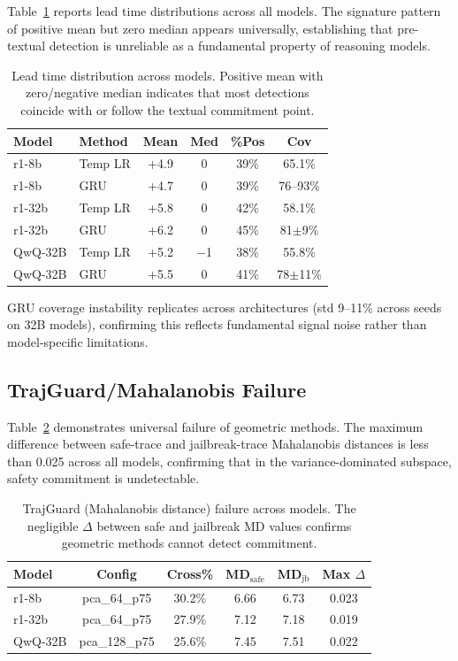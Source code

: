 \documentclass[11pt,a4paper]{article}
\begin{document}
Table~\ref{tab:lead} reports lead time distributions across all models. The signature pattern of positive mean but zero median appears universally, establishing that pre-textual detection is unreliable as a fundamental property of reasoning models.

\begin{table}[t]
\centering
\small
\caption{Lead time distribution across models. Positive mean with zero/negative median indicates that most detections coincide with or follow the textual commitment point.}
\label{tab:lead}
\begin{tabular}{llcccc}
\toprule
Model & Method & Mean & Med & \%Pos & Cov \\
\midrule
r1-8b & Temp LR & +4.9 & 0 & 39\% & 65.1\% \\
r1-8b & GRU & +4.7 & 0 & 39\% & 76--93\% \\
r1-32b & Temp LR & +5.8 & 0 & 42\% & 58.1\% \\
r1-32b & GRU & +6.2 & 0 & 45\% & 81$\pm$9\% \\
QwQ-32B & Temp LR & +5.2 & $-$1 & 38\% & 55.8\% \\
QwQ-32B & GRU & +5.5 & 0 & 41\% & 78$\pm$11\% \\
\bottomrule
\end{tabular}
\end{table}

GRU coverage instability replicates across architectures (std 9--11\% across seeds on 32B models), confirming this reflects fundamental signal noise rather than model-specific limitations.

\subsection{TrajGuard/Mahalanobis Failure}

Table~\ref{tab:trajguard} demonstrates universal failure of geometric methods. The maximum difference between safe-trace and jailbreak-trace Mahalanobis distances is less than 0.025 across all models, confirming that in the variance-dominated subspace, safety commitment is undetectable.

\begin{table}[t]
\centering
\small
\caption{TrajGuard (Mahalanobis distance) failure across models. The negligible $\Delta$ between safe and jailbreak MD values confirms geometric methods cannot detect commitment.}
\label{tab:trajguard}
\begin{tabular}{lccccc}
\toprule
Model & Config & Cross\% & MD$_{\text{safe}}$ & MD$_{\text{jb}}$ & Max $\Delta$ \\
\midrule
r1-8b & pca\_64\_p75 & 30.2\% & 6.66 & 6.73 & 0.023 \\
r1-32b & pca\_64\_p75 & 27.9\% & 7.12 & 7.18 & 0.019 \\
QwQ-32B & pca\_128\_p75 & 25.6\% & 7.45 & 7.51 & 0.022 \\
\bottomrule
\end{tabular}
\end{table}
\end{document}
